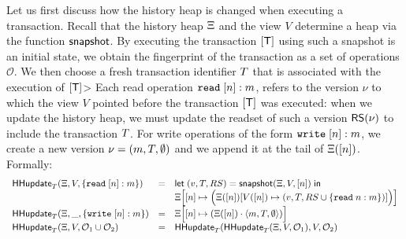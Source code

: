 \documentclass[a4paper,UKenglish]{article}%
\theoremstyle{plain}
\begin{document}
Let us first discuss how the history heap is changed when executing a transaction. 
Recall that the history heap $\Xi$ and the view $V$ determine a heap 
via the function $\mathsf{snapshot}$. By executing the transaction $[\mathsf{T}]$ using 
such a snapshot is an initial state, we obtain the fingerprint of the transaction 
as a set of operations $\mathcal{O}$. We then choose a fresh transaction identifier 
$T$ that is associated with the execution of $[\mathsf{T}]$> 
Each read operation ${{\tt read}}\;[n]:m$, 
refers to the version $\nu$ to which the view $V$ pointed before the transaction $[\mathsf{T}]$ 
was executed: when we update the history heap, we must update the readset of 
such a version $\mathsf{RS}(\nu)$ to include the transaction $T$. For write 
operations of the form ${{\tt write}}\;[n]:m$, we create a new version 
$\nu = (m, T, \emptyset)$ and we append it at the tail of $\Xi([n])$.
Formally: 
\[
\begin{array}{lll}
\mathsf{HHupdate}_{T}(\Xi, V, \{{{\tt read}}\;[n]: m\}) &=& 
\mathsf{let}\; (v, T, RS) = \mathsf{snapshot}(\Xi,V, [n]) \; \mathsf{in} \; \\
&&
\Xi\Big[ [n] \mapsto  \Big( \Xi([n])  [ V([n]) \mapsto (v, T, RS \cup \{ {{\tt read}}\;n: m\} ) ] \Big) \Big]
\\
\mathsf{HHupdate}_{T}(\Xi, \_, \{{{\tt write}}\; [n]: m\}) &=& 
\Xi\Big[ [n] \mapsto ( \Xi([n]) \cdot \langle m, T, \emptyset \rangle) \Big]\\
\mathsf{HHupdate}_{T}(\Xi, V, \mathcal{O}_1 \cup \mathcal{O}_2) &=& 
\mathsf{HHupdate}_{T}(\mathsf{HHupdate}_{T}(\Xi, V, \mathcal{O}_1), V, \mathcal{O}_2)
\end{array}
\]
\end{document}
